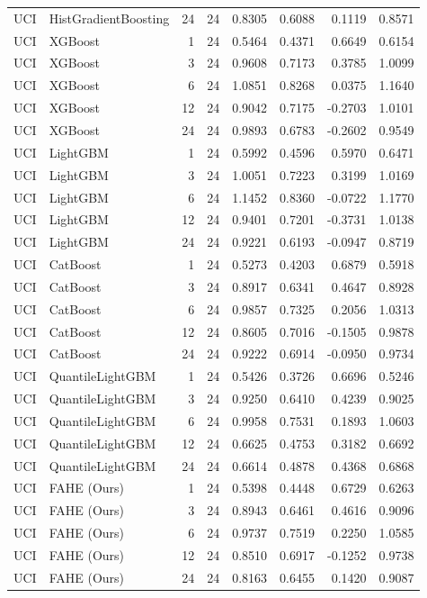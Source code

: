 \begin{tabular}{llrrrrrr}
UCI & HistGradientBoosting & 24 & 24 & 0.8305 & 0.6088 & 0.1119 & 0.8571 \\
UCI & XGBoost & 1 & 24 & 0.5464 & 0.4371 & 0.6649 & 0.6154 \\
UCI & XGBoost & 3 & 24 & 0.9608 & 0.7173 & 0.3785 & 1.0099 \\
UCI & XGBoost & 6 & 24 & 1.0851 & 0.8268 & 0.0375 & 1.1640 \\
UCI & XGBoost & 12 & 24 & 0.9042 & 0.7175 & -0.2703 & 1.0101 \\
UCI & XGBoost & 24 & 24 & 0.9893 & 0.6783 & -0.2602 & 0.9549 \\
UCI & LightGBM & 1 & 24 & 0.5992 & 0.4596 & 0.5970 & 0.6471 \\
UCI & LightGBM & 3 & 24 & 1.0051 & 0.7223 & 0.3199 & 1.0169 \\
UCI & LightGBM & 6 & 24 & 1.1452 & 0.8360 & -0.0722 & 1.1770 \\
UCI & LightGBM & 12 & 24 & 0.9401 & 0.7201 & -0.3731 & 1.0138 \\
UCI & LightGBM & 24 & 24 & 0.9221 & 0.6193 & -0.0947 & 0.8719 \\
UCI & CatBoost & 1 & 24 & 0.5273 & 0.4203 & 0.6879 & 0.5918 \\
UCI & CatBoost & 3 & 24 & 0.8917 & 0.6341 & 0.4647 & 0.8928 \\
UCI & CatBoost & 6 & 24 & 0.9857 & 0.7325 & 0.2056 & 1.0313 \\
UCI & CatBoost & 12 & 24 & 0.8605 & 0.7016 & -0.1505 & 0.9878 \\
UCI & CatBoost & 24 & 24 & 0.9222 & 0.6914 & -0.0950 & 0.9734 \\
UCI & QuantileLightGBM & 1 & 24 & 0.5426 & 0.3726 & 0.6696 & 0.5246 \\
UCI & QuantileLightGBM & 3 & 24 & 0.9250 & 0.6410 & 0.4239 & 0.9025 \\
UCI & QuantileLightGBM & 6 & 24 & 0.9958 & 0.7531 & 0.1893 & 1.0603 \\
UCI & QuantileLightGBM & 12 & 24 & 0.6625 & 0.4753 & 0.3182 & 0.6692 \\
UCI & QuantileLightGBM & 24 & 24 & 0.6614 & 0.4878 & 0.4368 & 0.6868 \\
UCI & FAHE (Ours) & 1 & 24 & 0.5398 & 0.4448 & 0.6729 & 0.6263 \\
UCI & FAHE (Ours) & 3 & 24 & 0.8943 & 0.6461 & 0.4616 & 0.9096 \\
UCI & FAHE (Ours) & 6 & 24 & 0.9737 & 0.7519 & 0.2250 & 1.0585 \\
UCI & FAHE (Ours) & 12 & 24 & 0.8510 & 0.6917 & -0.1252 & 0.9738 \\
UCI & FAHE (Ours) & 24 & 24 & 0.8163 & 0.6455 & 0.1420 & 0.9087 \\
\bottomrule
\end{tabular}
